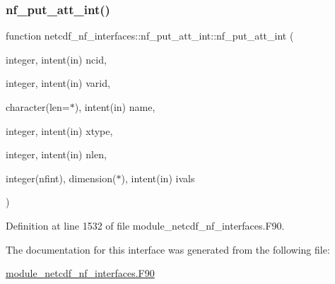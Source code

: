 \subsubsection{\texorpdfstring{nf\+\_\+put\+\_\+att\+\_\+int()}{nf\_put\_att\_int()}}
{\footnotesize\ttfamily function netcdf\+\_\+nf\+\_\+interfaces\+::nf\+\_\+put\+\_\+att\+\_\+int\+::nf\+\_\+put\+\_\+att\+\_\+int (\begin{DoxyParamCaption}\item[{integer, intent(in)}]{ncid,  }\item[{integer, intent(in)}]{varid,  }\item[{character(len=$\ast$), intent(in)}]{name,  }\item[{integer, intent(in)}]{xtype,  }\item[{integer, intent(in)}]{nlen,  }\item[{integer(nfint), dimension($\ast$), intent(in)}]{ivals }\end{DoxyParamCaption})}



Definition at line 1532 of file module\+\_\+netcdf\+\_\+nf\+\_\+interfaces.\+F90.



The documentation for this interface was generated from the following file\+:\begin{DoxyCompactItemize}
\item 
\hyperlink{module__netcdf__nf__interfaces_8F90}{module\+\_\+netcdf\+\_\+nf\+\_\+interfaces.\+F90}\end{DoxyCompactItemize}

